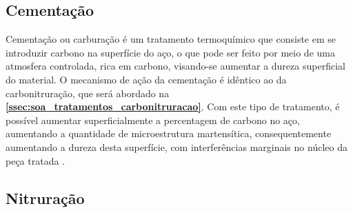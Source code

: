 \subsection{Cementação} \label{ssec:soa_tratamentos_cementação}

Cementação ou carburação é um tratamento termoquímico que consiste em se introduzir carbono na superfície do aço, o que pode ser feito por meio de uma atmosfera controlada, rica em carbono, visando-se aumentar a dureza superficial do material. O mecanismo de ação da cementação é idêntico ao da carbonitruração, que será abordado na \textbf{\ref{ssec:soa_tratamentos_carbonitruracao}}. Com este tipo de tratamento, é possível aumentar superficialmente a percentagem de carbono no aço, aumentando a quantidade de microestrutura martensítica, consequentemente aumentando a dureza desta superfície, com interferências marginais no núcleo da peça tratada \cite{Oberg1989}.

\subsection{Nitruração}

